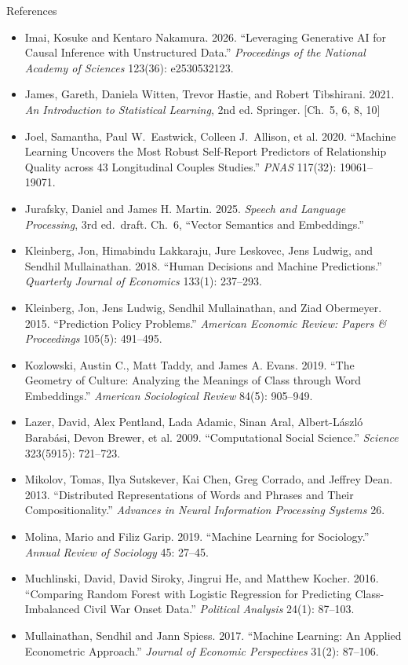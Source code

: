 \documentclass[aspectratio=169,11pt,xcolor=dvipsnames]{beamer}
\begin{document}
\begin{frame}[allowframebreaks,t]{References}
\begin{itemize}
\item Imai, Kosuke and Kentaro Nakamura. 2026. ``Leveraging Generative AI for Causal Inference with Unstructured Data.'' \textit{Proceedings of the National Academy of Sciences} 123(36): e2530532123.
\item James, Gareth, Daniela Witten, Trevor Hastie, and Robert Tibshirani. 2021. \textit{An Introduction to Statistical Learning}, 2nd ed. Springer. [Ch.\ 5, 6, 8, 10]
\item Joel, Samantha, Paul W.\ Eastwick, Colleen J.\ Allison, et al. 2020. ``Machine Learning Uncovers the Most Robust Self-Report Predictors of Relationship Quality across 43 Longitudinal Couples Studies.'' \textit{PNAS} 117(32): 19061--19071.
\item Jurafsky, Daniel and James H. Martin. 2025. \textit{Speech and Language Processing}, 3rd ed.\ draft. Ch.\ 6, ``Vector Semantics and Embeddings.''
\item Kleinberg, Jon, Himabindu Lakkaraju, Jure Leskovec, Jens Ludwig, and Sendhil Mullainathan. 2018. ``Human Decisions and Machine Predictions.'' \textit{Quarterly Journal of Economics} 133(1): 237--293.
\item Kleinberg, Jon, Jens Ludwig, Sendhil Mullainathan, and Ziad Obermeyer. 2015. ``Prediction Policy Problems.'' \textit{American Economic Review: Papers \& Proceedings} 105(5): 491--495.
\item Kozlowski, Austin C., Matt Taddy, and James A. Evans. 2019. ``The Geometry of Culture: Analyzing the Meanings of Class through Word Embeddings.'' \textit{American Sociological Review} 84(5): 905--949.
\item Lazer, David, Alex Pentland, Lada Adamic, Sinan Aral, Albert-L\'aszl\'o Barab\'asi, Devon Brewer, et al. 2009. ``Computational Social Science.'' \textit{Science} 323(5915): 721--723.
\item Mikolov, Tomas, Ilya Sutskever, Kai Chen, Greg Corrado, and Jeffrey Dean. 2013. ``Distributed Representations of Words and Phrases and Their Compositionality.'' \textit{Advances in Neural Information Processing Systems} 26.
\item Molina, Mario and Filiz Garip. 2019. ``Machine Learning for Sociology.'' \textit{Annual Review of Sociology} 45: 27--45.
\item Muchlinski, David, David Siroky, Jingrui He, and Matthew Kocher. 2016. ``Comparing Random Forest with Logistic Regression for Predicting Class-Imbalanced Civil War Onset Data.'' \textit{Political Analysis} 24(1): 87--103.
\item Mullainathan, Sendhil and Jann Spiess. 2017. ``Machine Learning: An Applied Econometric Approach.'' \textit{Journal of Economic Perspectives} 31(2): 87--106.

\end{itemize}
\end{frame}
\end{document}
